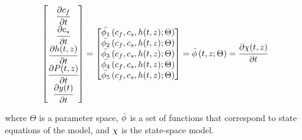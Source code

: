 \documentclass[../Article_Model_Parameters.tex]{subfiles}
\begin{document}
			{\footnotesize
				\begin{align}
					\begin{bmatrix}
						\cfrac{\partial c_f}{\partial t}\\
						\cfrac{\partial c_s}{\partial t}\\
						\cfrac{\partial {\color{black}h}(t,z)}{\partial t} \\
						\cfrac{\partial {\color{black}P}(t,z)}{\partial t} \\
						\cfrac{\partial {\color{black}y}(t)}{\partial t} 
					\end{bmatrix}
					& =
					\begin{bmatrix}
						{\color{black}\bar{\phi_1}} \left( c_f,c_s,{\color{black}h}(t,z); \Theta \right)\\
						{\color{black}\bar{\phi_2}} \left( c_f,c_s,{\color{black}h}(t,z); \Theta \right)\\
						{\color{black}\bar{\phi_3}} \left( c_f,c_s,{\color{black}h}(t,z); \Theta \right) \\
						{\color{black}\bar{\phi_4}} \left( c_f,c_s,{\color{black}h}(t,z); \Theta \right)\\
						{\color{black}\bar{\phi_5}} \left( c_f,c_s,{\color{black}h}(t,z); \Theta \right)
					\end{bmatrix} = {\color{black}\bar{\phi}} \left( t,z; \Theta \right) = \cfrac{\partial {\color{black}\chi}(t,z)}{\partial t}
			\end{align} }
			
			where $\Theta$ is a parameter space, ${\color{black}\bar{\phi}}$ is a set of functions that correspond to state equations of the model, and ${\color{black}\chi}$ is the state-space model.
			
			\fi
			
			
			
\end{document}
